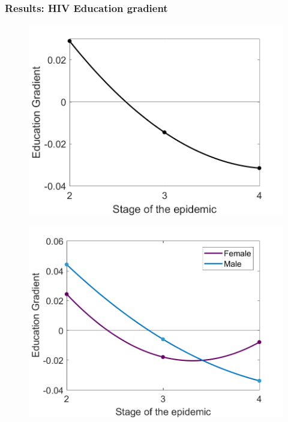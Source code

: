\documentclass{beamer}
\begin{document}
\begin{frame}
\frametitle{Results: HIV Education gradient}

\begin{figure}[H]
\centering
\begin{minipage}{.5\textwidth}
 \centering
\includegraphics[width = 1\linewidth, height = 0.5\textheight]{fig_grad1.png}
\label{fig_grad1}
\end{minipage}%
\begin{minipage}{.5\textwidth}
\centering
{}
\includegraphics[width = 1\linewidth, height = 0.5\textheight]{fig_grad2.png}
\label{fig_grad2}
\end{minipage}
\end{figure}


\end{frame}
\end{document}
